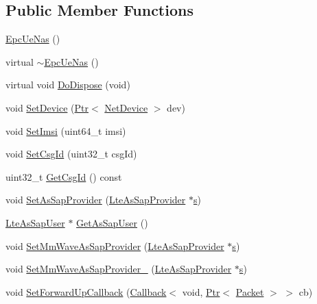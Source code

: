 \subsection*{Public Member Functions}
\begin{DoxyCompactItemize}
\item 
\hyperlink{classns3_1_1EpcUeNas_a6477bdf88447ac3489dd622f89b76816}{Epc\+Ue\+Nas} ()
\item 
virtual \hyperlink{classns3_1_1EpcUeNas_ac0452f724b2a5cd296d208d77f74252c}{$\sim$\+Epc\+Ue\+Nas} ()
\item 
virtual void \hyperlink{classns3_1_1EpcUeNas_aadf2172d26124d3fb33cf2f7b9bc6531}{Do\+Dispose} (void)
\item 
void \hyperlink{classns3_1_1EpcUeNas_a3ca7a155a590ad97eb27670d130a111b}{Set\+Device} (\hyperlink{classns3_1_1Ptr}{Ptr}$<$ \hyperlink{classns3_1_1NetDevice}{Net\+Device} $>$ dev)
\item 
void \hyperlink{classns3_1_1EpcUeNas_ab5f1c1ed2a7a12dba8a3ec36f13e3954}{Set\+Imsi} (uint64\+\_\+t imsi)
\item 
void \hyperlink{classns3_1_1EpcUeNas_abafeec8cbdf8bc001a5c9574e5e9ff02}{Set\+Csg\+Id} (uint32\+\_\+t csg\+Id)
\item 
uint32\+\_\+t \hyperlink{classns3_1_1EpcUeNas_a851420c1448afead4a013b4b10d03d4e}{Get\+Csg\+Id} () const 
\item 
void \hyperlink{classns3_1_1EpcUeNas_ab92c42f6021dff22c6cfa16cc60b7742}{Set\+As\+Sap\+Provider} (\hyperlink{classns3_1_1LteAsSapProvider}{Lte\+As\+Sap\+Provider} $\ast$\hyperlink{generate__test__data__lte__sinr_8m_ad83eeb3a142285d1243a08c6b7026df8}{s})
\item 
\hyperlink{classns3_1_1LteAsSapUser}{Lte\+As\+Sap\+User} $\ast$ \hyperlink{classns3_1_1EpcUeNas_a735e655afc15303f7a4999dabb1d1f21}{Get\+As\+Sap\+User} ()
\item 
void \hyperlink{classns3_1_1EpcUeNas_aa3430b459eed35d579d608b8081b334a}{Set\+Mm\+Wave\+As\+Sap\+Provider} (\hyperlink{classns3_1_1LteAsSapProvider}{Lte\+As\+Sap\+Provider} $\ast$\hyperlink{generate__test__data__lte__sinr_8m_ad83eeb3a142285d1243a08c6b7026df8}{s})
\item 
void \hyperlink{classns3_1_1EpcUeNas_aa062d997041ef61683796779ace4c2f2}{Set\+Mm\+Wave\+As\+Sap\+Provider\+\_} (\hyperlink{classns3_1_1LteAsSapProvider}{Lte\+As\+Sap\+Provider} $\ast$\hyperlink{generate__test__data__lte__sinr_8m_ad83eeb3a142285d1243a08c6b7026df8}{s})
\item 
void \hyperlink{classns3_1_1EpcUeNas_ad3abd7f2e7540e051322c36ee63379c7}{Set\+Forward\+Up\+Callback} (\hyperlink{classns3_1_1Callback}{Callback}$<$ void, \hyperlink{classns3_1_1Ptr}{Ptr}$<$ \hyperlink{classns3_1_1Packet}{Packet} $>$ $>$ cb)

\end{DoxyCompactItemize}
